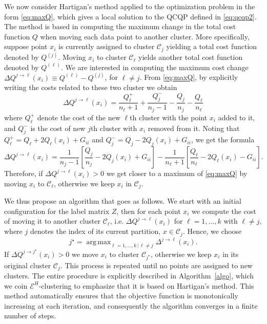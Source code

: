 \documentclass[aps,preprint,nofootinbib,floatfix]{revtex4-1}
\DeclareMathOperator*{\argmax}{arg\,max}
\newcommand\C{{\mathcal{C}}}
\begin{document}
We now consider Hartigan's method \cite{Hartigan} 
applied to the optimization problem in the form \eqref{eq:maxQ}, which gives
a local solution to the QCQP defined in \eqref{eq:qcqp2}. 
The method is based in computing the maximum change
in the total cost function $Q$ when moving each data point to
another cluster. More specifically, 
suppose point $x_i$
is currently assigned to  cluster $\C_j$ yielding
a total cost function denoted by $Q^{(j)}$.
Moving $x_i$ to cluster $\C_\ell$ yields another total cost function
denoted by $Q^{(\ell)}$. We are interested in computing the maximum 
cost change
$\Delta Q^{j\to \ell} (x_i) \equiv Q^{(\ell)} - Q^{(j)}$, for $\ell\ne j$. 
From \eqref{eq:maxQ}, by explicitly writing the costs related to these 
two cluster we obtain
\begin{equation}
\Delta Q^{j\to \ell} (x_i) = \dfrac{Q_\ell^{+}}{n_\ell+1} + 
\dfrac{Q_j^-}{n_j-1} - \dfrac{Q_j}{n_j} - \dfrac{Q_\ell}{n_\ell}
\end{equation}
where $Q^{+}_\ell$ denote the cost of the new $\ell$th cluster
with the point $x_i$ added to it, and $Q^-_j$ is the cost of new 
$j$th cluster with $x_i$ removed from it. Noting that 
$Q_\ell^{+} = Q_\ell + 2 Q_\ell(x_i) + G_{ii}$ and
$Q_j^{-} = Q_j - 2 Q_j(x_i) + G_{ii}$, we get the formula
\begin{equation}
\label{eq:changeQ}
\Delta Q^{j \to \ell}(x_i)  = 
\dfrac{1}{n_j - 1}\left[ \dfrac{Q_j}{n_j} - 2 Q_j(x_i) + G_{ii} \right]
- \dfrac{1}{n_\ell + 1}\left[ \dfrac{Q_\ell}{n_\ell} - 2 Q_\ell(x_i) 
- G_{ii} \right].
\end{equation}
Therefore, if $\Delta Q^{j\to \ell}(x_i) > 0$ we get closer to a 
maximum of \eqref{eq:maxQ} by
moving $x_i$ to $\C_\ell$, otherwise we keep $x_i$ in $\C_j$. 

We thus propose an algorithm that goes as follows.
We start with an initial configuration for the label matrix $Z$, 
then for each
point $x_i$ 
we compute the cost of moving it to another cluster $\C_\ell$, i.e.
$\Delta Q^{j\to \ell}(x_i)$ for 
$\ell=1,\dots,k$ with $\ell \ne j$, where $j$ denotes the index of its current
partition, $x \in \C_j$. Hence, we choose
\begin{equation}
j^\star = \argmax_{\ell=1,\dotsc,k \, | \, \ell\ne j} 
\Delta^{j \to \ell}(x_i).
\end{equation}
If $\Delta Q^{j \to j^\star}(x_i) > 0$ 
we move $x_i$ to cluster $\C_{j^\star}$, otherwise 
we keep $x_i$ in its original cluster $\C_j$. 
This process is repeated
until no points are assigned to new clusters. 
The entire procedure is explicitly described in Algorithm~\ref{algo}, which we
coin $\mathcal{E}^H$-clustering to emphasize that it is based on
Hartigan's method.
This method automatically ensures that the objective function is
monotonically increasing at each iteration, and consequently the algorithm
converges in a finite number of steps.
\end{document}
